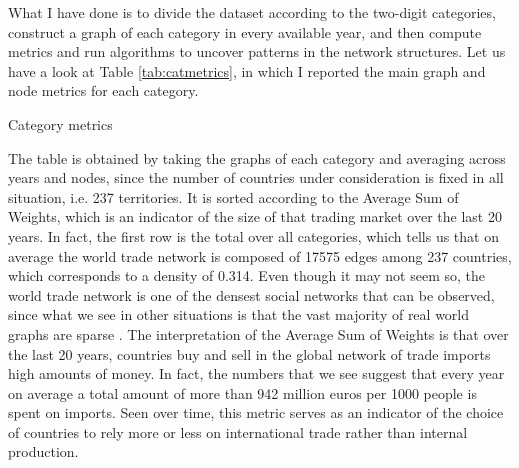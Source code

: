What I have done is to divide the dataset according to the two-digit categories, construct a graph of each category in every available year, and then compute metrics and run algorithms to uncover patterns in the network structures.
Let us have a look at Table \ref{tab:catmetrics}, in which I reported the main graph and node metrics for each category.

\begin{table}
    
    \caption{Category metrics}
    \label{tab:catmetrics}
\end{table}

The table is obtained by taking the graphs of each category and averaging across years and nodes, since the number of countries under consideration is fixed in all situation, i.e. 237 territories.
It is sorted according to the Average Sum of Weights, which is an indicator of the size of that trading market over the last 20 years. In fact, the first row is the total over all categories, which tells us that on average the world trade network is composed of 17575 edges among 237 countries, which corresponds to a density of 0.314. Even though it may not seem so, the world trade network is one of the densest social networks that can be observed, since what we see in other situations is that the vast majority of real world graphs are sparse \cite{barabasi2016network}. The interpretation of the Average Sum of Weights is that over the last 20 years, countries buy and sell in the global network of trade imports high amounts of money. In fact, the numbers that we see suggest that every year on average a total amount of more than 942 million euros per 1000 people is spent on imports. Seen over time, this metric serves as an indicator of the choice of countries to rely more or less on international trade rather than internal production.
